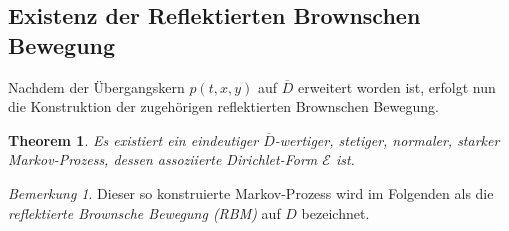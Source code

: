 \documentclass[10pt, a4paper, leqno, twoside, bibliography=totocnumbered, final]{scrartcl}
\theoremstyle{definition}
\theoremstyle{plain}%
\newtheorem{thm}[defin]{Theorem}
\theoremstyle{remark}
\newtheorem*{bem}{Bemerkung}
\begin{document}
\subsection{Existenz der Reflektierten Brownschen Bewegung}
\label{sec:Thm-RBM}

Nachdem der Übergangskern $ p(t,x,y) $ auf $ \overline{D} $ erweitert worden ist, erfolgt nun die Konstruktion der zugehörigen reflektierten Brownschen Bewegung.

\begin{thm}
\label{sec: Thm-MP}
Es existiert ein eindeutiger $ \overline{D} $-wertiger, stetiger, normaler, starker Markov-Prozess, dessen assoziierte Dirichlet-Form $ \mathscr{E} $ ist.
\end{thm}

\begin{bem}
Dieser so konstruierte Markov-Prozess wird im Folgenden als die \emph{reflektierte Brownsche Bewegung (RBM)} auf $ D $ bezeichnet.
\end{bem}
\end{document}
